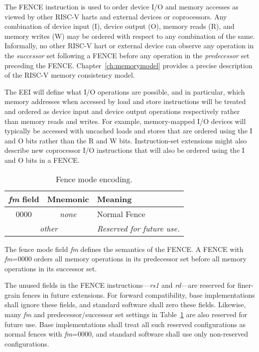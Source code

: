 The FENCE instruction is used to order device I/O and
memory accesses as viewed by other RISC-V harts and external devices
or coprocessors.  Any combination of device input (I), device output
(O), memory reads (R), and memory writes (W) may be ordered with
respect to any combination of the same.  Informally, no other RISC-V
hart or external device can observe any operation in the {\em
  successor} set following a FENCE before any operation in the {\em
  predecessor} set preceding the FENCE.
Chapter~\ref{ch:memorymodel} provides a precise description of the
RISC-V memory consistency model.
  
The EEI will define what I/O operations are possible, and in
particular, which memory addresses when accessed by load and store instructions will be treated and
ordered as device input and device output operations respectively
rather than memory reads and writes.  For example, memory-mapped I/O
devices will typically be accessed with uncached loads and stores that
are ordered using the I and O bits rather than the R and W bits.
Instruction-set extensions might also describe new coprocessor I/O
instructions that will also be ordered using the I and O bits in a
FENCE.

\begin{table}[htp]
\begin{small}
\begin{center}
\begin{tabular}{|c|c|l|}
\hline
{\em fm} field & Mnemonic & Meaning \\
\hline
0000 & \em none & Normal Fence \\
\hline
\multicolumn{2}{|c|}{\em other} & \em Reserved for future use. \\
\hline
\end{tabular}
\end{center}
\end{small}
\caption{Fence mode encoding.}
\label{fm}
\end{table}

The fence mode field {\em fm} defines the semantics of the FENCE.  A
FENCE with {\em fm}=0000 orders all memory operations in its
predecessor set before all memory operations in its successor set. 

The unused fields in the FENCE instructions---{\em rs1} and {\em rd}---are
reserved for finer-grain fences in future extensions.  For forward
compatibility, base implementations shall ignore these fields, and standard
software shall zero these fields.  Likewise, many {\em fm} and
predecessor/successor set settings in Table~\ref{fm} are also reserved
for future use.  Base implementations shall treat all such reserved
configurations as normal fences with {\em fm}=0000, and standard
software shall use only non-reserved configurations.

